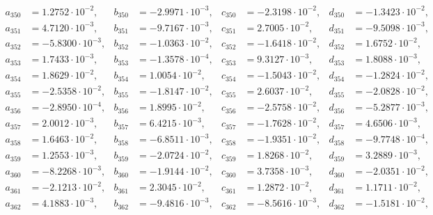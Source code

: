 \begin{align*}
  a_{ 350 } &= 1.2752 \cdot 10^{ -2 }, & b_{ 350 } &= -2.9971 \cdot 10^{ -3 }, & c_{ 350 } &= -2.3198 \cdot 10^{ -2 }, & d_{ 350 } &= -1.3423 \cdot 10^{ -2 }, \\ 
  a_{ 351 } &= 4.7120 \cdot 10^{ -3 }, & b_{ 351 } &= -9.7167 \cdot 10^{ -3 }, & c_{ 351 } &= 2.7005 \cdot 10^{ -2 }, & d_{ 351 } &= -9.5098 \cdot 10^{ -3 }, \\ 
  a_{ 352 } &= -5.8300 \cdot 10^{ -3 }, & b_{ 352 } &= -1.0363 \cdot 10^{ -2 }, & c_{ 352 } &= -1.6418 \cdot 10^{ -2 }, & d_{ 352 } &= 1.6752 \cdot 10^{ -2 }, \\ 
  a_{ 353 } &= 1.7433 \cdot 10^{ -3 }, & b_{ 353 } &= -1.3578 \cdot 10^{ -4 }, & c_{ 353 } &= 9.3127 \cdot 10^{ -3 }, & d_{ 353 } &= 1.8088 \cdot 10^{ -3 }, \\ 
  a_{ 354 } &= 1.8629 \cdot 10^{ -2 }, & b_{ 354 } &= 1.0054 \cdot 10^{ -2 }, & c_{ 354 } &= -1.5043 \cdot 10^{ -2 }, & d_{ 354 } &= -1.2824 \cdot 10^{ -2 }, \\ 
  a_{ 355 } &= -2.5358 \cdot 10^{ -2 }, & b_{ 355 } &= -1.8147 \cdot 10^{ -2 }, & c_{ 355 } &= 2.6037 \cdot 10^{ -2 }, & d_{ 355 } &= -2.0828 \cdot 10^{ -2 }, \\ 
  a_{ 356 } &= -2.8950 \cdot 10^{ -4 }, & b_{ 356 } &= 1.8995 \cdot 10^{ -2 }, & c_{ 356 } &= -2.5758 \cdot 10^{ -2 }, & d_{ 356 } &= -5.2877 \cdot 10^{ -3 }, \\ 
  a_{ 357 } &= 2.0012 \cdot 10^{ -3 }, & b_{ 357 } &= 6.4215 \cdot 10^{ -3 }, & c_{ 357 } &= -1.7628 \cdot 10^{ -2 }, & d_{ 357 } &= 4.6506 \cdot 10^{ -3 }, \\ 
  a_{ 358 } &= 1.6463 \cdot 10^{ -2 }, & b_{ 358 } &= -6.8511 \cdot 10^{ -3 }, & c_{ 358 } &= -1.9351 \cdot 10^{ -2 }, & d_{ 358 } &= -9.7748 \cdot 10^{ -4 }, \\ 
  a_{ 359 } &= 1.2553 \cdot 10^{ -3 }, & b_{ 359 } &= -2.0724 \cdot 10^{ -2 }, & c_{ 359 } &= 1.8268 \cdot 10^{ -2 }, & d_{ 359 } &= 3.2889 \cdot 10^{ -3 }, \\ 
  a_{ 360 } &= -8.2268 \cdot 10^{ -3 }, & b_{ 360 } &= -1.9144 \cdot 10^{ -2 }, & c_{ 360 } &= 3.7358 \cdot 10^{ -3 }, & d_{ 360 } &= -2.0351 \cdot 10^{ -2 }, \\ 
  a_{ 361 } &= -2.1213 \cdot 10^{ -2 }, & b_{ 361 } &= 2.3045 \cdot 10^{ -2 }, & c_{ 361 } &= 1.2872 \cdot 10^{ -2 }, & d_{ 361 } &= 1.1711 \cdot 10^{ -2 }, \\ 
  a_{ 362 } &= 4.1883 \cdot 10^{ -3 }, & b_{ 362 } &= -9.4816 \cdot 10^{ -3 }, & c_{ 362 } &= -8.5616 \cdot 10^{ -3 }, & d_{ 362 } &= -1.5181 \cdot 10^{ -2 }, \\ 

\end{align*}
